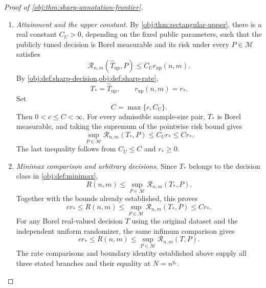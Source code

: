 \documentclass[11pt]{article}
\begin{document}
\begin{proof}[Proof of \cref{obj:thm:sharp-annotation-frontier}]
\begin{enumerate}
\item \emph{Attainment and the upper constant.}
By \cref{obj:thm:rectangular-upper}, there is a real constant \(C_U>0\), depending on the fixed public parameters, such that the publicly tuned decision is Borel measurable and its risk under every \(P\in\mathcal M\) satisfies
\[
\mathcal R_{n,m}(\widehat T_{\mathrm{up}},P)
\le C_U r_{\mathrm{up}}(n,m).
\]
By \cref{obj:def:sharp-decision,obj:def:sharp-rate},
\[
T_*=\widehat T_{\mathrm{up}},
\qquad
r_{\mathrm{up}}(n,m)=r_*.
\]
Set
\[
C=\max\{c,C_U\}.
\]
Then \(0<c\le C<\infty\). For every admissible sample-size pair, \(T_*\) is Borel measurable, and taking the supremum of the pointwise risk bound gives
\[
\sup_{P\in\mathcal M}\mathcal R_{n,m}(T_*,P)
\le C_U r_*
\le C r_*.
\]
The last inequality follows from \(C_U\le C\) and \(r_*\ge0\).

\item \emph{Minimax comparison and arbitrary decisions.}
Since \(T_*\) belongs to the decision class in \cref{obj:def:minimax},
\[
R(n,m)\le
\sup_{P\in\mathcal M}\mathcal R_{n,m}(T_*,P).
\]
Together with the bounds already established, this proves
\[
c r_*
\le R(n,m)
\le\sup_{P\in\mathcal M}\mathcal R_{n,m}(T_*,P)
\le C r_*.
\]
For any Borel real-valued decision \(T\) using the original dataset and the independent uniform randomizer, the same infimum comparison gives
\[
c r_*\le R(n,m)
\le\sup_{P\in\mathcal M}\mathcal R_{n,m}(T,P).
\]
The rate comparisons and boundary identity established above supply all three stated branches and their equality at \(N=n^{q_*}\).
\end{enumerate}
\end{proof}
\end{document}

